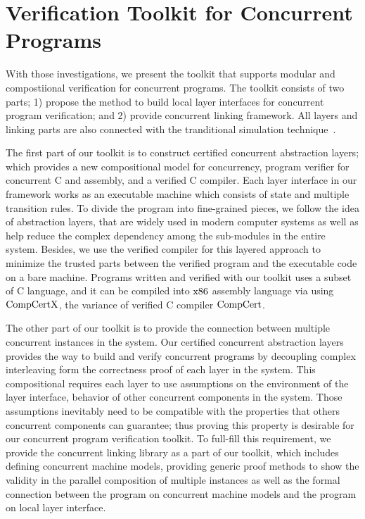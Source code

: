 \section{Verification Toolkit for Concurrent Programs}
\label{chapter:introduction:sec:verification-toolkit-for-concurrent-programs}
%
With those investigations, we present the toolkit that supports modular and compostiional 
verification  for concurrent programs. 
The toolkit consists of two parts;
1) propose the method to build  local layer interfaces for concurrent program verification;
and 2) provide concurrent linking framework.
All layers and linking parts are also connected with the tranditional simulation technique~\cite{compcert, deepspec}. 
 
The first part of our toolkit is to construct certified concurrent 
abstraction layers;
which provides
a new compositional model for concurrency, program verifier for concurrent C and assembly,
and a verified C compiler.
Each layer interface in our framework 
works as an executable machine which consists of state and multiple transition rules.
To divide the program into fine-grained pieces,
we follow the idea of 
abstraction layers,
that are widely used in modern computer systems 
as well as help reduce 
the complex dependency 
among the sub-modules in the entire system.
Besides, we use the verified compiler for this layered approach to minimize the trusted parts between the verified program and the executable code on a bare machine. 
Programs written and verified with our toolkit uses a subset of C language, 
and it can be compiled into $\mathrm{x86}$ assembly language via using $\mathrm{CompCertX}$, the variance of verified C compiler $\mathrm{CompCert}$. 

The other part of our toolkit is to
provide the connection between multiple concurrent instances in the system.
Our certified concurrent abstraction layers 
provides the way to build and verify 
concurrent programs by decoupling complex interleaving form the correctness proof of each layer in the system.
This compositional requires each layer to use assumptions on the environment of the layer interface, behavior of other concurrent components in the system.
Those assumptions inevitably need to be compatible with 
the properties that others concurrent components can guarantee;
thus proving this property is desirable for our concurrent program verification toolkit. 
To full-fill this requirement, 
we provide the concurrent linking library as a part of our toolkit,
which includes 
defining concurrent machine models, providing generic proof methods to show the validity in the parallel composition of multiple instances 
as well as the formal connection between the program on concurrent machine models and 
the program on local layer interface. 


